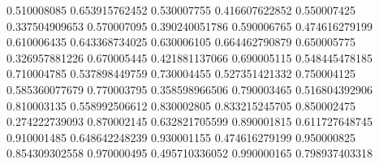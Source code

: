     0.510008085    0.653915762452
    0.530007755    0.416607622852
    0.550007425    0.337504909653
    0.570007095    0.390240051786
    0.590006765    0.474616279199
    0.610006435    0.643368734025
    0.630006105    0.664462790879
    0.650005775    0.326957881226
    0.670005445    0.421881137066
    0.690005115    0.548445478185
    0.710004785    0.537898449759
    0.730004455    0.527351421332
    0.750004125    0.585360077679
    0.770003795    0.358598966506
    0.790003465    0.516804392906
    0.810003135    0.558992506612
    0.830002805    0.833215245705
    0.850002475    0.274222739093
    0.870002145    0.632821705599
    0.890001815    0.611727648745
    0.910001485    0.648642248239
    0.930001155    0.474616279199
    0.950000825    0.854309302558
    0.970000495    0.495710336052
    0.990000165    0.798937403318
